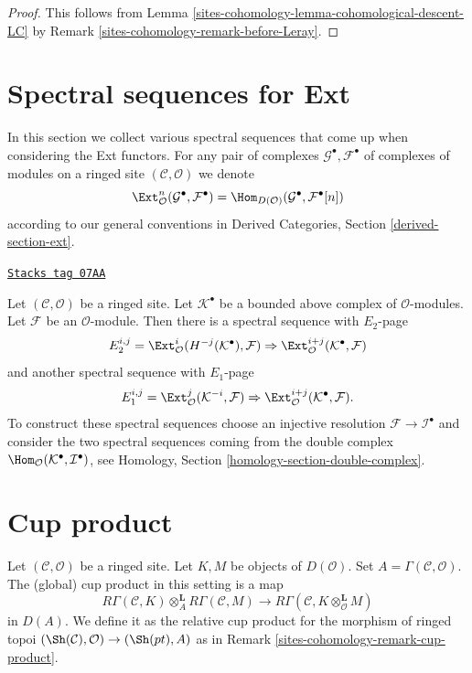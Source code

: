 \begin{proof}
This follows from Lemma \ref{sites-cohomology-lemma-cohomological-descent-LC}
by Remark \ref{sites-cohomology-remark-before-Leray}.
\end{proof}

\section{Spectral sequences for Ext}
\label{sites-cohomology-section-spectral-sequence-ext}
In this section we collect various spectral sequences that come up
when considering the Ext functors. For any pair of complexes
$\mathcal{G}^\bullet, \mathcal{F}^\bullet$ of complexes of modules
on a ringed site $(\mathcal{C}, \mathcal{O})$ we denote
$$
\Ext^n_\mathcal{O}(\mathcal{G}^\bullet, \mathcal{F}^\bullet)
=
\Hom_{D(\mathcal{O})}(\mathcal{G}^\bullet, \mathcal{F}^\bullet[n])
$$
according to our general conventions in
Derived Categories, Section \ref{derived-section-ext}.

\begin{example}
\label{sites-cohomology-example-hom-complex-into-sheaf}
\href{https://stacks.math.columbia.edu/tag/07AA}{\texttt{Stacks tag 07AA}}

Let $(\mathcal{C}, \mathcal{O})$ be a ringed site.
Let $\mathcal{K}^\bullet$ be a bounded above complex of $\mathcal{O}$-modules.
Let $\mathcal{F}$ be an $\mathcal{O}$-module. Then there is a
spectral sequence with $E_2$-page
$$
E_2^{i, j} =
\Ext_\mathcal{O}^i(H^{-j}(\mathcal{K}^\bullet), \mathcal{F})
\Rightarrow
\Ext_\mathcal{O}^{i + j}(\mathcal{K}^\bullet, \mathcal{F})
$$
and another spectral sequence with $E_1$-page
$$
E_1^{i, j} =
\Ext_\mathcal{O}^j(\mathcal{K}^{-i}, \mathcal{F})
\Rightarrow
\Ext_\mathcal{O}^{i + j}(\mathcal{K}^\bullet, \mathcal{F}).
$$
To construct these spectral sequences choose an injective resolution
$\mathcal{F} \to \mathcal{I}^\bullet$ and consider the two spectral
sequences coming from the double complex
$\Hom_\mathcal{O}(\mathcal{K}^\bullet, \mathcal{I}^\bullet)$, see
Homology, Section \ref{homology-section-double-complex}.
\end{example}

\section{Cup product}
\label{sites-cohomology-section-cup-product}
Let $(\mathcal{C}, \mathcal{O})$ be a ringed site. Let
$K, M$ be objects of $D(\mathcal{O})$. Set
$A = \Gamma(\mathcal{C}, \mathcal{O})$. The (global) cup product
in this setting is a map
$$
R\Gamma(\mathcal{C}, K) \otimes_A^\mathbf{L}
R\Gamma(\mathcal{C}, M)
\longrightarrow
R\Gamma(\mathcal{C}, K \otimes_\mathcal{O}^\mathbf{L} M)
$$
in $D(A)$. We define it as the relative cup product for
the morphism of ringed topoi
$(\Sh(\mathcal{C}), \mathcal{O}) \to (\Sh(pt), A)$
as in Remark \ref{sites-cohomology-remark-cup-product}.

